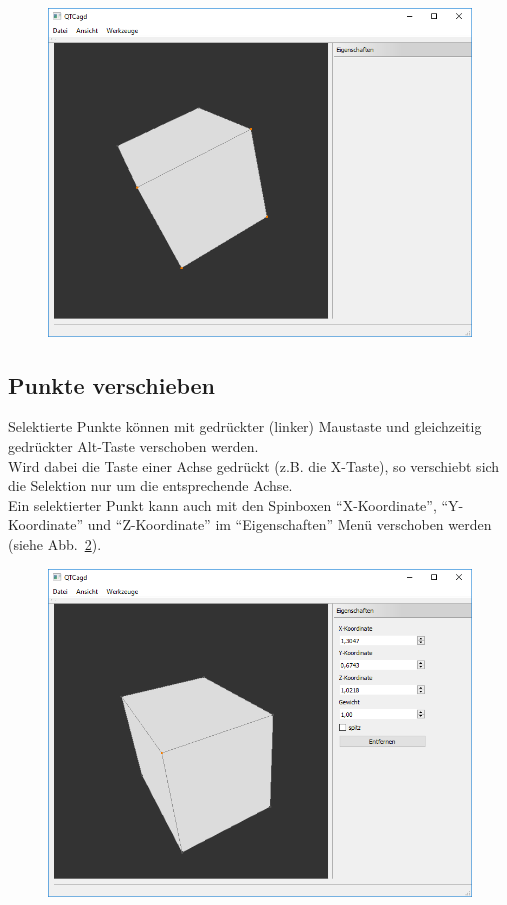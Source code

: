 \begin{figure}[H]
	\centering
	\includegraphics[scale=0.5]{content/pictures/3-ObjekteSelektieren}
	\caption{}
	\label{fig:ObjekteSelektieren}
\end{figure}

\subsection{Punkte verschieben}
Selektierte Punkte können mit gedrückter (linker) Maustaste und gleichzeitig gedrückter Alt-Taste verschoben werden.\\
Wird dabei die Taste einer Achse gedrückt (z.B. die X-Taste), so verschiebt sich die Selektion nur um die entsprechende Achse.\\
Ein selektierter Punkt kann auch mit den Spinboxen "`X-Koordinate"', "`Y-Koordinate"' und "`Z-Koordinate"' im "`Eigenschaften"' Menü verschoben werden (siehe Abb.~\ref{fig:PunkteVerschieben}).

\begin{figure}[H]
	\centering
	\includegraphics[scale=0.5]{content/pictures/4-PunkteVerschieben}
	\caption{}
	\label{fig:PunkteVerschieben}
\end{figure}

